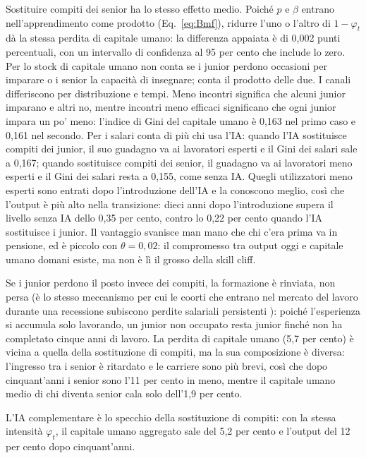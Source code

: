 \documentclass[preprint,12pt,authoryear]{elsarticle}
\begin{document}
Sostituire compiti dei senior ha lo stesso effetto medio. Poiché $p$ e $\beta$ entrano nell'apprendimento come prodotto (Eq.~\eqref{eq:Bmf}), ridurre l'uno o l'altro di $1-\varphi_t$ dà la stessa perdita di capitale umano: la differenza appaiata è di 0,002 punti percentuali, con un intervallo di confidenza al 95 per cento che include lo zero. Per lo stock di capitale umano non conta se i junior perdono occasioni per imparare o i senior la capacità di insegnare; conta il prodotto delle due. I canali differiscono per distribuzione e tempi. Meno incontri significa che alcuni junior imparano e altri no, mentre incontri meno efficaci significano che ogni junior impara un po' meno: l'indice di Gini del capitale umano è 0,163 nel primo caso e 0,161 nel secondo. Per i salari conta di più chi usa l'IA: quando l'IA sostituisce compiti dei junior, il suo guadagno va ai lavoratori esperti e il Gini dei salari sale a 0,167; quando sostituisce compiti dei senior, il guadagno va ai lavoratori meno esperti e il Gini dei salari resta a 0,155, come senza IA. Quegli utilizzatori meno esperti sono entrati dopo l'introduzione dell'IA e la conoscono meglio, così che l'output è più alto nella transizione: dieci anni dopo l'introduzione supera il livello senza IA dello 0,35 per cento, contro lo 0,22 per cento quando l'IA sostituisce i junior. Il vantaggio svanisce man mano che chi c'era prima va in pensione, ed è piccolo con $\theta=0{,}02$: il compromesso tra output oggi e capitale umano domani esiste, ma non è lì il grosso della skill cliff.

Se i junior perdono il posto invece dei compiti, la formazione è rinviata, non persa (è lo stesso meccanismo per cui le coorti che entrano nel mercato del lavoro durante una recessione subiscono perdite salariali persistenti \citep{Kahn2010,Oreopoulos2012}): poiché l'esperienza si accumula solo lavorando, un junior non occupato resta junior finché non ha completato cinque anni di lavoro. La perdita di capitale umano (5,7 per cento) è vicina a quella della sostituzione di compiti, ma la sua composizione è diversa: l'ingresso tra i senior è ritardato e le carriere sono più brevi, così che dopo cinquant'anni i senior sono l'11 per cento in meno, mentre il capitale umano medio di chi diventa senior cala solo dell'1,9 per cento.

L'IA complementare è lo specchio della sostituzione di compiti: con la stessa intensità $\varphi_t$, il capitale umano aggregato sale del 5,2 per cento e l'output del 12 per cento dopo cinquant'anni.
\end{document}
